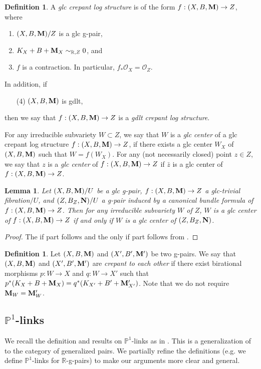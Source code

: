 \documentclass[11pt]{amsart}
\numberwithin{equation}{section}
\newcommand{\Mm}{{\bf{M}}}
\newcommand{\NN}{{\bf{N}}}
\newcommand{\Rr}{\mathbb{R}}
\newcommand{\Oo}{\mathcal{O}}
\newtheorem{lem}[thm]{Lemma}
\theoremstyle{definition}
\newtheorem{defn}[thm]{Definition}
\theoremstyle{definition}
\theoremstyle{definition}
\begin{document}
\begin{defn}
  A \emph{glc crepant log structure} is of the form $f:
  (X,B,\Mm)\rightarrow Z$, where
  \begin{enumerate}
    \item $(X,B,\Mm)/Z$ is a glc g-pair,
    \item $K_X+B+\Mm_X\sim_{\Rr,Z}0$, and
    \item $f$ is a contraction. In particular, $f_*\Oo_X=\Oo_Z$.
  \end{enumerate}
  In addition, if
  \begin{enumerate}
    \item[(4)] $(X,B,\Mm)$ is gdlt,
  \end{enumerate}
  then we say that $f: (X,B,\Mm)\rightarrow Z$ is a \emph{gdlt
  crepant log structure}.

  For any irreducible subvariety $W\subset Z$, we say that $W$ is a
  \emph{glc center} of a glc crepant log structure $f:
  (X,B,\Mm)\rightarrow Z$, if there exists a glc center $W_X$ of
  $(X,B,\Mm)$ such that $W=f(W_X)$. For any (not necessarily closed)
  point $z\in Z$, we say that $z$ is a \emph{glc center} of $f:
  (X,B,\Mm)\rightarrow Z$ if $\bar z$ is a glc center of $f:
  (X,B,\Mm)\rightarrow Z$.
\end{defn}

\begin{lem}\label{lem: glc centers come from cbf}
  Let $(X,B,\Mm)/U$ be a glc g-pair, $f: (X,B,\Mm)\rightarrow Z$ a
  glc-trivial fibration$/U$, and $(Z,B_Z,\NN)/U$ a g-pair induced by
  a canonical bundle formula of $f: (X,B,\Mm)\rightarrow Z$. Then for
  any irreducible subvariety $W$ of $Z$, $W$ is a glc center of $f:
  (X,B,\Mm)\rightarrow Z$ if and only if $W$ is a glc center of $(Z,B_Z,\NN)$.
\end{lem}
\begin{proof}
  The if part follows \cite[Theorem 2.23]{JLX22}  and the only if
  part follows from \cite[Theorem 2.16(2)]{LX22}.
\end{proof}

\begin{defn}
  Let $(X,B,\Mm)$ and $(X',B',\Mm')$ be two g-pairs. We say that
  $(X,B,\Mm)$ and $(X',B',\Mm')$ are \emph{crepant to each other} if
  there exist birational morphisms $p: W\rightarrow X$ and $q:
  W\rightarrow X'$ such that
  $p^*(K_X+B+\Mm_X)=q^*(K_{X'}+B'+\Mm'_{X'})$. Note that we do not
  require $\Mm_W=\Mm'_W$.
\end{defn}

\subsection{\texorpdfstring{$\mathbb P^1$}{}-links}
We recall the definition and results on $\mathbb P^1$-links as in
\cite{FS20}. This is a generalization of \cite[Theorem 4.40]{Kol13}
to the category of generalized pairs. We partially refine the
definitions (e.g. we define $\mathbb P^1$-links for $\mathbb
R$-g-pairs) to make our arguments more clear and general.
\end{document}
